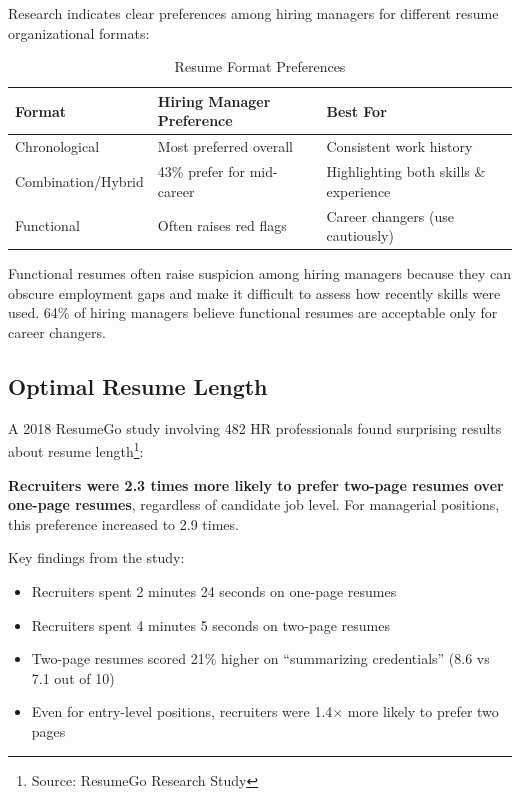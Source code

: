\documentclass[11pt,a4paper]{article}
\begin{document}
Research indicates clear preferences among hiring managers for different resume organizational formats:

\begin{table}[h]
\centering
\begin{tabular}{@{}lll@{}}
\toprule
\textbf{Format} & \textbf{Hiring Manager Preference} & \textbf{Best For} \\
\midrule
Chronological & Most preferred overall & Consistent work history \\
Combination/Hybrid & 43\% prefer for mid-career & Highlighting both skills \& experience \\
Functional & Often raises red flags & Career changers (use cautiously) \\
\bottomrule
\end{tabular}
\caption{Resume Format Preferences}
\end{table}

\begin{warning}
Functional resumes often raise suspicion among hiring managers because they can obscure employment gaps and make it difficult to assess how recently skills were used. 64\% of hiring managers believe functional resumes are acceptable only for career changers.
\end{warning}

\subsection{Optimal Resume Length}

A 2018 ResumeGo study involving 482 HR professionals found surprising results about resume length\footnote{Source: ResumeGo Research Study}:

\begin{keystat}
\textbf{Recruiters were 2.3 times more likely to prefer two-page resumes over one-page resumes}, regardless of candidate job level. For managerial positions, this preference increased to 2.9 times.
\end{keystat}

Key findings from the study:
\begin{itemize}
    \item Recruiters spent 2 minutes 24 seconds on one-page resumes
    \item Recruiters spent 4 minutes 5 seconds on two-page resumes
    \item Two-page resumes scored 21\% higher on ``summarizing credentials'' (8.6 vs 7.1 out of 10)
    \item Even for entry-level positions, recruiters were 1.4$\times$ more likely to prefer two pages
\end{itemize}
\end{document}
